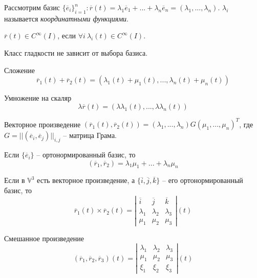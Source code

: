 \begin{Def}
	Рассмотрим базис $\{\overline{e}_i\}_{i = 1}^n : \overline{r}(t) = \lambda_1 \overline{e}_1 + ... + \lambda_n \overline{e}_n = (\lambda_1, ..., \lambda_n)$.
	$\lambda_i$ называется \textit{координатными функциями}.
\end{Def}

\begin{Def}
	$\overline{r}(t) \in C^\infty (I)$, если $\forall i \ \lambda_i(t) \in C^\infty(I)$. 
\end{Def}

\begin{Rem}
	Класс гладкости не зависит от выбора базиса.
\end{Rem}

\begin{Thm}
	\begin{MyList}
		\item Сложение
		\[\overline{r}_1(t) + \overline{r}_2(t) = (\lambda_1(t) + \mu_1(t), ..., \lambda_n(t) + \mu_n(t))\]

		\item Умножение на скаляр
		\[\lambda \overline{r}(t) = (\lambda \lambda_1(t), ..., \lambda \lambda_n(t))\]

		\item Векторное произведение
		$(\overline{r}_1(t), \overline{r}_2(t)) = (\lambda_1, ..., \lambda_n) G (\mu_1, ..., \mu_n)^T$, где $G = ||(\overline{e}_i, \overline{e}_j)||_{i, j}$ -- матрица Грама.
		
		Если $\{\overline{e}_i\}$ -- ортонормированный базис, то
		\[(\overline{r}_1, \overline{r}_2) = \lambda_1 \mu_1 + ... + \lambda_n \mu_n\]

		\item Если в $\mathbb{V}^3$ есть векторное произведение, а $\{\overline{i}, \overline{j}, \overline{k}\}$ -- его ортонормированный базис, то
		\[\overline{r}_1(t) \times \overline{r}_2(t) = \left|\begin{array}{ccc}
		\overline{i} & \overline{j} & \overline{k} \\ 
		\lambda_1 & \lambda_2 & \lambda_3 \\ 
		\mu_1 & \mu_2 & \mu_3
		\end{array}\right|(t)\]
		
		\item Смешанное произведение
		\[(\overline{r}_1, \overline{r}_2, \overline{r}_3)(t) = \left|\begin{array}{ccc}
		\lambda_1 & \lambda_2 & \lambda_3 \\ 
		\mu_1 & \mu_2 & \mu_3 \\ 
		\xi_1 & \xi_2 & \xi_3
		\end{array}\right|(t)\]


\end{MyList}
\end{Thm}
